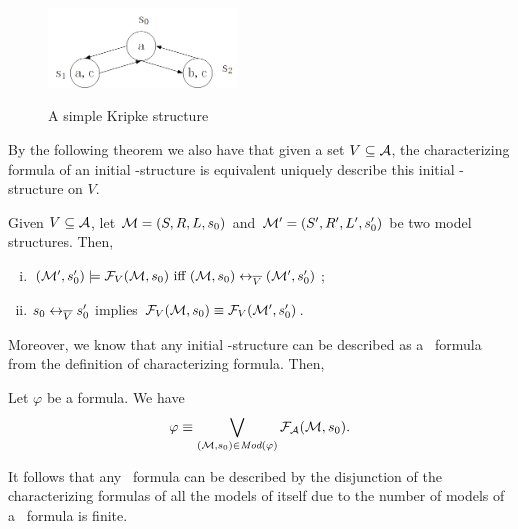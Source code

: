 \documentclass{article}
\begin{document}
\begin{example}
\begin{figure}
  \centering
  \includegraphics[width=5cm]{k1.png}\\
  \caption{A simple Kripke structure}\label{Kripke_1}
\end{figure}
\end{example}

By the following theorem we also have that given a set $V\subseteq {\cal A}$, the characterizing formula of an initial \MPK-structure is equivalent uniquely describe this initial \MPK-structure on $V$.
\begin{theorem}\label{CF}
Given $V\subseteq {\cal A}$, let ${\cal M}=(S,R,L,s_0)$  and ${\cal M}'=(S',R', L',s_0')$ be two model structures. Then,
\begin{enumerate}[(i)]
 \item $({\cal M}',s_0') \models {\cal F}_V({\cal M},s_0)
\text{ iff }
({\cal M},s_0) \leftrightarrow_{\overline V} ({\cal M}',s_0')$;

\item $s_0 \leftrightarrow_{\overline V} s_0'$ implies  ${\cal F}_V({\cal M}, s_0) \equiv {\cal F}_V({\cal M}', s_0')$.
\end{enumerate}

\end{theorem}

Moreover, we know that any initial \MPK-structure can be described as a \CTL\ formula from the definition of characterizing formula. Then,
\begin{lemma}\label{lem:models:formula}
  Let $\varphi$ be a formula. We have
  \begin{equation}
    \varphi\equiv \bigvee_{({\cal M}, s_0)\in\textit{Mod}(\varphi)}{\cal F}_{\cal A}({\cal M}, s_0).
\end{equation}
\end{lemma}
It follows that any \CTL\ formula can be described by the disjunction of the characterizing formulas of all the models of itself due to the number of models of a \CTL\ formula is finite.




\end{document}
